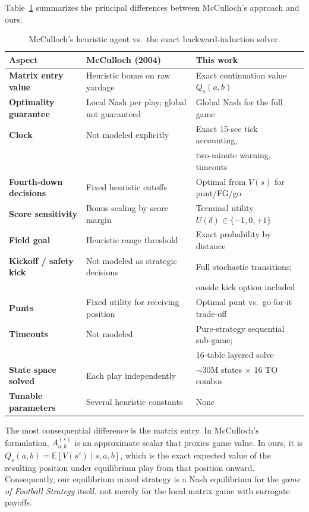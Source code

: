 \documentclass[11pt,letterpaper]{article}
\begin{document}
Table~\ref{tab:compare} summarizes the principal differences between McCulloch's approach
and ours.

\begin{table}[ht]
\centering
\caption{McCulloch's heuristic agent vs.\ the exact backward-induction solver.}
\label{tab:compare}
\setlength{\tabcolsep}{6pt}
\begin{tabular}{lll}
\toprule
Aspect & McCulloch (2004) & This work \\
\midrule
\textbf{Matrix entry value} &
  Heuristic bonus on raw yardage &
  Exact continuation value $Q_s(a,b)$ \\[2pt]
\textbf{Optimality guarantee} &
  Local Nash per play; global not guaranteed &
  Global Nash for the full game \\[2pt]
\textbf{Clock} &
  Not modeled explicitly &
  Exact 15-sec tick accounting, \\
  & & two-minute warning, timeouts \\[2pt]
\textbf{Fourth-down decisions} &
  Fixed heuristic cutoffs &
  Optimal from $V(s)$ for punt/FG/go \\[2pt]
\textbf{Score sensitivity} &
  Bonus scaling by score margin &
  Terminal utility $U(\delta)\in\{-1,0,+1\}$ \\[2pt]
\textbf{Field goal} &
  Heuristic range threshold &
  Exact probability by distance \\[2pt]
\textbf{Kickoff / safety kick} &
  Not modeled as strategic decisions &
  Full stochastic transitions; \\
  & & onside kick option included \\[2pt]
\textbf{Punts} &
  Fixed utility for receiving position &
  Optimal punt vs.\ go-for-it trade-off \\[2pt]
\textbf{Timeouts} &
  Not modeled &
  Pure-strategy sequential sub-game; \\
  & & 16-table layered solve \\[2pt]
\textbf{State space solved} &
  Each play independently &
  ${\sim}30$M states $\times$ 16 TO combos \\[2pt]
\textbf{Tunable parameters} &
  Several heuristic constants &
  None \\
\bottomrule
\end{tabular}
\end{table}

The most consequential difference is the matrix entry.  In McCulloch's formulation,
$A^{(s)}_{a,b}$ is an approximate scalar that proxies game value.  In ours, it is
$Q_s(a,b) = \mathbb{E}[V(s') \mid s,a,b]$, which is the exact expected value of the
resulting position under equilibrium play from that position onward.  Consequently, our
equilibrium mixed strategy is a Nash equilibrium for the \emph{game of Football Strategy}
itself, not merely for the local matrix game with surrogate payoffs.
\end{document}
